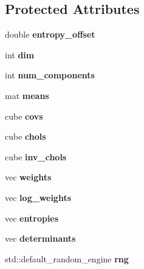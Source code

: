 \subsection*{Protected Attributes}
\begin{DoxyCompactItemize}
\item 
double {\bfseries entropy\+\_\+offset}\hypertarget{classGMM_afbdca4e356f354e6ab36c2975aa7ae94}{}\label{classGMM_afbdca4e356f354e6ab36c2975aa7ae94}

\item 
int {\bfseries dim}\hypertarget{classGMM_a94d1cbf3cd1c15b81d2ac5809273304a}{}\label{classGMM_a94d1cbf3cd1c15b81d2ac5809273304a}

\item 
int {\bfseries num\+\_\+components}\hypertarget{classGMM_afa64fb9b37cff173b5ad1105c34abb2b}{}\label{classGMM_afa64fb9b37cff173b5ad1105c34abb2b}

\item 
mat {\bfseries means}\hypertarget{classGMM_ae8876c900c276e64c75ba799354fc46b}{}\label{classGMM_ae8876c900c276e64c75ba799354fc46b}

\item 
cube {\bfseries covs}\hypertarget{classGMM_abb060a06a7d148fb220ba3524030b7c9}{}\label{classGMM_abb060a06a7d148fb220ba3524030b7c9}

\item 
cube {\bfseries chols}\hypertarget{classGMM_ad6b6fd943a44e972792b01db68042eec}{}\label{classGMM_ad6b6fd943a44e972792b01db68042eec}

\item 
cube {\bfseries inv\+\_\+chols}\hypertarget{classGMM_a2b50c3568e366f5f774b2f73bb239977}{}\label{classGMM_a2b50c3568e366f5f774b2f73bb239977}

\item 
vec {\bfseries weights}\hypertarget{classGMM_ac92b4a601ede428eb4a6b20c9be252d9}{}\label{classGMM_ac92b4a601ede428eb4a6b20c9be252d9}

\item 
vec {\bfseries log\+\_\+weights}\hypertarget{classGMM_abfa4ad63087bb64e6324c231ad88478a}{}\label{classGMM_abfa4ad63087bb64e6324c231ad88478a}

\item 
vec {\bfseries entropies}\hypertarget{classGMM_a7b6ae5a12e6230d7a8ad06f6c86fb247}{}\label{classGMM_a7b6ae5a12e6230d7a8ad06f6c86fb247}

\item 
vec {\bfseries determinants}\hypertarget{classGMM_a18bbf0ad6127d7cd8f65fc688030d830}{}\label{classGMM_a18bbf0ad6127d7cd8f65fc688030d830}

\item 
std\+::default\+\_\+random\+\_\+engine {\bfseries rng}\hypertarget{classGMM_a6a5f6bf173dea2faf179b75065d1b806}{}\label{classGMM_a6a5f6bf173dea2faf179b75065d1b806}

\end{DoxyCompactItemize}


